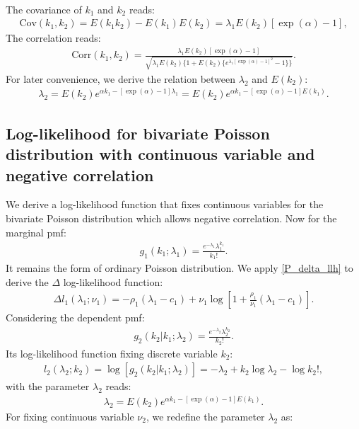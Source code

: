 \documentclass[submission, Phys]{SciPost}
\begin{document}
\begin{appendix}
\begin{align}
\end{align}
The covariance of $k_1$ and $k_2$ reads:
\begin{align}
\text{Cov}(k_1,k_2)=E(k_1k_2)-E(k_1)E(k_2)=\lambda_1E(k_2)[\exp(\alpha)-1],
\end{align}
The correlation reads:
\begin{align}
\text{Corr}(k_1,k_2) = \frac{\lambda_1E(k_2)[\exp(\alpha)-1]}{\sqrt{\lambda_1E(k_2)\{1+E(k_2)\{e^{\lambda_1[\exp(\alpha)-1]^2}-1\}\}}}.\label{Corr}
\end{align}
For later convenience, we derive the relation between $\lambda_2$ and $E(k_2)$:
\begin{align}
\lambda_2 = E(k_2)e^{\alpha k_1 - [\exp(\alpha)-1]\lambda_1}=E(k_2)e^{\alpha k_1 - [\exp(\alpha)-1]E(k_1)}.\label{relation}
\end{align}
\subsection{Log-likelihood for bivariate Poisson distribution with continuous variable and negative correlation}
We derive a log-likelihood function that fixes continuous variables for the bivariate Poisson distribution which allows negative correlation. Now for the marginal pmf:
\begin{align}
g_{1}(k_{1};\lambda_1)=\frac{e^{-\lambda_{1}}\lambda_{1}^{k_{1}}}{k_{1}!}.
\end{align}
It remains the form of ordinary Poisson distribution. We apply \ref{P_delta_llh} to derive the $\Delta$ log-likelihood function:
\begin{align}
\Delta l_1(\lambda_1;\nu_1) = -\rho_1(\lambda_1-c_{1}) + \nu_1\log\left[1+\frac{\rho_1}{\nu_1}(\lambda_1-c_1)\right].
\end{align}
Considering the dependent pmf:
\begin{align}
g_{2}(k_{2}|k_{1};\lambda_2)=\frac{e^{-\lambda_{2}}\lambda_{2}^{k_{2}}}{k_{2}!}.
\end{align}   
Its log-likelihood function fixing discrete variable $k_2$:
\begin{align}
l_2(\lambda_2; k_2) = \log [g_{2}(k_{2}|k_{1};\lambda_2)]=-\lambda_2 + k_2\log \lambda_2 - \log k_2!,
\end{align}
with the parameter $\lambda_2$ reads:
\begin{align}
\lambda_2 = E(k_2)e^{\alpha k_1 - [\exp(\alpha)-1]E(k_1)}.
\end{align}
For fixing continuous variable $\nu_2$, we redefine the parameter $\lambda_2$ as:

\end{appendix}
\end{document}
